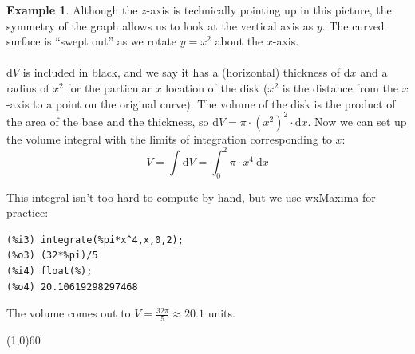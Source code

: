 \documentclass[10.5pt,twoside]{report}
\theoremstyle{definition}
\newtheorem{exmp}{Example}[section]
\begin{document}
\begin{exmp}
Although the $z$-axis is technically pointing up in this picture, the symmetry of the graph allows us to look at the vertical axis as $y$.  The curved surface is ``swept out'' as we rotate $y=x^2$ about the $x$-axis.  \\
${}$\\
$\mathrm{d}V$ is included in black, and we say it has a (horizontal) thickness of $\mathrm{d}x$ and a radius of $x^2$ for the particular $x$ location of the disk ($x^2$ is the distance from the $x$-axis to a point on the original curve).  The volume of the disk is the product of the area of the base and the thickness, so  $\mathrm{d}V=\pi\cdot (x^2)^2\cdot \mathrm{d}x$.  Now we can set up the volume integral with the limits of integration corresponding to $x$: 
\[V=\int \mathrm{d}V=\int_0^2 \pi\cdot x^4\ \mathrm{d}x\]

This integral isn't too hard to compute by hand, but we use wxMaxima for practice:\\

\begin{verbatim}
(%i3) integrate(%pi*x^4,x,0,2);
(%o3) (32*%pi)/5
(%i4) float(%);
(%o4) 20.10619298297468
\end{verbatim}

The volume comes out to $V=\frac{32\pi}{5}\approx 20.1$ units.

\end{exmp}

\line(1,0){60}
\linethickness{0.5mm}
\end{document}
